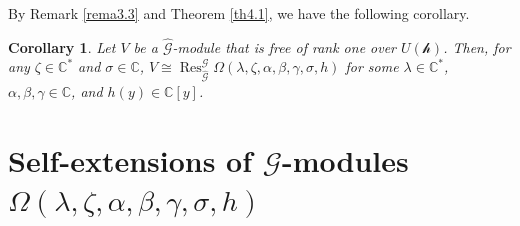 \documentclass[12pt,reqno]{amsart}
\def\Z{\mathbb{Z}}
\def\C{\mathbb{C}}
\numberwithin{equation}{section}
\newtheorem{coro}[theo]{Corollary}
\newtheorem{prop}[theo]{Proposition}
\begin{document}
By Remark \ref{rema3.3} and Theorem \ref{th4.1}, we have the following corollary.

\begin{coro}
    Let $V$ be a $\hat{\mathcal{G}}$-module that is free of rank one over $U(\mathcal{h})$. Then, for any $\zeta\in\C^*$ and $\sigma\in\C$, $V\cong {\operatorname{Res}}_{\hat{\mathcal{G}}}^{\mathcal{G}}\Omega(\lambda, \zeta,\alpha,\beta,\gamma,\sigma,h)$ for some $\lambda\in\C^*$, $\alpha, \beta, \gamma\in\C$, and $h(y)\in\C[y]$.
\end{coro}


















\section{\texorpdfstring{ Self-extensions of $\mathcal{G}$-modules $\Omega(\lambda, \zeta, \alpha,\beta,\gamma,\sigma,h)$}{1}}\label{section 4}
\end{document}
